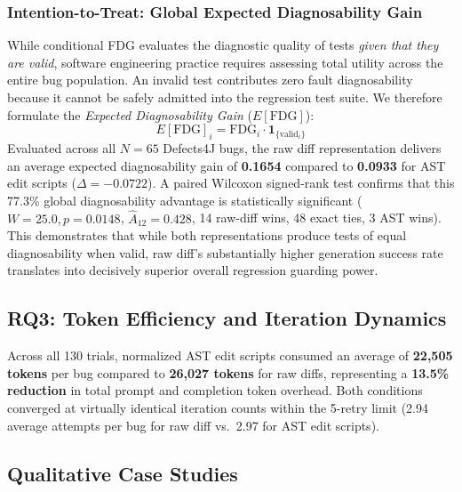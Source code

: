 \documentclass[12pt, a4paper]{article}
\begin{document}
\subsubsection{Intention-to-Treat: Global Expected Diagnosability Gain}\label{sec:expected_fdg}

While conditional FDG evaluates the diagnostic quality of tests \emph{given that they are valid}, software engineering practice requires assessing total utility across the entire bug population.
An invalid test contributes zero fault diagnosability because it cannot be safely admitted into the regression test suite.
We therefore formulate the \emph{Expected Diagnosability Gain} ($E[\text{FDG}]$):
\begin{equation}
  E[\text{FDG}]_i = \text{FDG}_i \cdot \mathbf{1}_{\{\text{valid}_i\}}
\end{equation}
Evaluated across all $N=65$ Defects4J bugs, the raw diff representation delivers an average expected diagnosability gain of \textbf{0.1654} compared to \textbf{0.0933} for AST edit scripts ($\Delta = -0.0722$).
A paired Wilcoxon signed-rank test confirms that this 77.3\% global diagnosability advantage is statistically significant ($W = 25.0, p = 0.0148$, $\hat{A}_{12} = 0.428$, 14 raw-diff wins, 48 exact ties, 3 AST wins).
This demonstrates that while both representations produce tests of equal diagnosability when valid, raw diff's substantially higher generation success rate translates into decisively superior overall regression guarding power.

\subsection{RQ3: Token Efficiency and Iteration Dynamics}\label{sec:res_rq3}

Across all 130 trials, normalized AST edit scripts consumed an average of \textbf{22,505 tokens} per bug compared to \textbf{26,027 tokens} for raw diffs, representing a \textbf{13.5\% reduction} in total prompt and completion token overhead.
Both conditions converged at virtually identical iteration counts within the 5-retry limit (2.94 average attempts per bug for raw diff vs.\ 2.97 for AST edit scripts).

\subsection{Qualitative Case Studies}\label{sec:cases}
\end{document}
